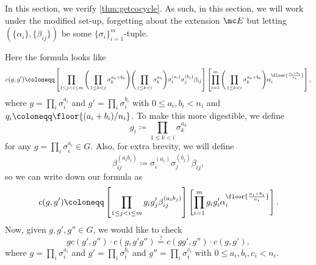 
In this section, we verify \autoref{thm:getcocycle}. As such, in this section, we will work under the modified set-up, forgetting about the extension $\mc E$ but letting $(\{\alpha_i\},\{\beta_{ij}\})$ be some $\{\sigma_i\}_{i=1}^m$-tuple.

Here the formula looks like
\[c(g,g')\coloneqq\left[\prod_{1\le j<i\le m}\Bigg(\prod_{1\le k<j}\sigma_k^{a_k+b_k}\Bigg)\Bigg(\prod_{j\le k<i}\sigma_k^{a_k}\Bigg)\sigma_i^{(a_i)}\sigma_j^{(b_j)}\beta_{ij}\right]\left[\prod_{i=1}^m\Bigg(\prod_{1\le k<i}\sigma_k^{a_k+b_k}\Bigg)\alpha_i^{\floor{\frac{a_i+b_i}{n_i}}}\right],\]
where $g=\prod_i\sigma_i^{a_i}$ and $g'=\prod_i\sigma_i^{b_i}$ with $0\le a_i,b_i<n_i$ and $q_i\coloneqq\floor{(a_i+b_i)/n_i}$. To make this more digestible, we define
\[g_i\coloneqq\prod_{1\le k<i}\sigma_k^{a_k}\]
for any $g=\prod_i\sigma_i^{a_i}\in G$. Also, for extra brevity, we will define
\[\beta_{ij}^{(a_ib_j)}\coloneqq\sigma_i^{(a_i)}\sigma_j^{(b_j)}\beta_{ij},\]
so we can write down our formula as
\[c(g,g')\coloneqq\left[\prod_{1\le j<i\le m}g_ig'_j\beta_{ij}^{(a_ib_j)}\right]\left[\prod_{i=1}^mg_ig'_i\alpha_i^{\floor{\frac{a_i+b_i}{n_i}}}\right].\]
Now, given $g,g',g''\in G$, we would like to check
\[gc(g',g'')\cdot c(g,g'g'')\stackrel?=c(gg',g'')\cdot c(g,g'),\]
where $g=\prod_i\sigma_i^{a_i}$ and $g'=\prod_i\sigma_i^{b_i}$ and $g''=\prod_i\sigma_i^{c_i}$ with $0\le a_i,b_i,c_i<n_i$.

